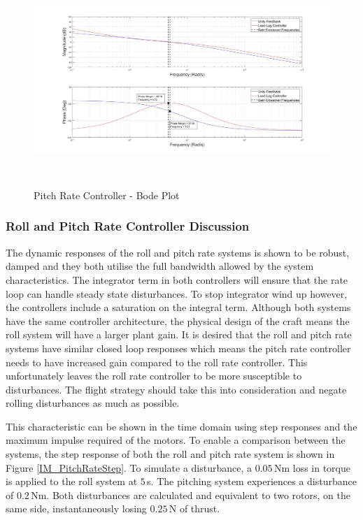 	\begin{figure}[H]
		\centering
		\includegraphics[height = 8cm]{../Design/Matlab/Controllers/pitch_rate_bode.jpg}
		\caption{Pitch Rate Controller -  Bode Plot}
		\label{IM_PitchRateControlBode}
	\end{figure}
		
		
		\subsubsection{Roll and Pitch Rate Controller Discussion}
		The dynamic responses of the roll and pitch rate systems is shown to be robust, damped and they both utilise the full bandwidth allowed by the system characteristics. The integrator term in both controllers will ensure that the rate loop can handle steady state disturbances. To stop integrator wind up however, the controllers include a saturation on the integral term. Although both systems have the same controller architecture, the physical design of the craft means the roll system will have a larger plant gain. It is desired that the roll and pitch rate systems have similar closed loop responses which means the pitch rate controller needs to have increased gain compared to the roll rate controller. This unfortunately leaves the roll rate controller to be more susceptible to disturbances. The flight strategy should take this into consideration and negate rolling disturbances as much as possible.
		
		This characteristic can be shown in the time domain using step responses and the maximum impulse required of the motors. To enable a comparison between the systems, the step response of both the roll and pitch rate system is shown in Figure \ref{IM_PitchRateStep}. To simulate a disturbance, a $0.05$\,Nm loss in torque is applied to the roll system at $5$\,s. The pitching system experiences a disturbance of $0.2$\,Nm. Both disturbances are calculated and equivalent to two rotors, on the same side, instantaneously losing $0.25$\,N of thrust.
		
